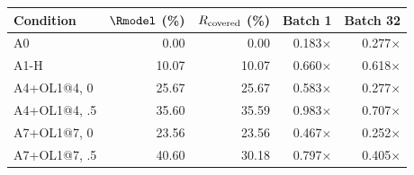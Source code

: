 \begin{tabular}{lrrrr}
\toprule
Condition & $\Rmodel$ (\%) & $R_{\rm covered}$ (\%) & Batch 1 & Batch 32 \\
\midrule
A0 & 0.00 & 0.00 & 0.183$\times$ & 0.277$\times$ \\
A1-H & 10.07 & 10.07 & 0.660$\times$ & 0.618$\times$ \\
A4+OL1@4, 0 & 25.67 & 25.67 & 0.583$\times$ & 0.277$\times$ \\
A4+OL1@4, .5 & 35.60 & 35.59 & 0.983$\times$ & 0.707$\times$ \\
A7+OL1@7, 0 & 23.56 & 23.56 & 0.467$\times$ & 0.252$\times$ \\
A7+OL1@7, .5 & 40.60 & 30.18 & 0.797$\times$ & 0.405$\times$ \\
\bottomrule
\end{tabular}
